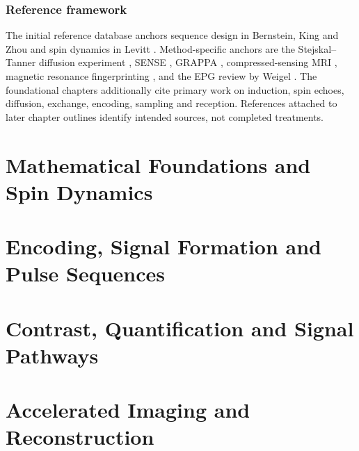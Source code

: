\documentclass[a4paper,10pt,twoside,openany]{book}
\begin{document}
\section*{Reference framework}
The initial reference database anchors sequence design in
Bernstein, King and Zhou \cite{bernstein2004} and spin dynamics in
Levitt \cite{levitt2008}. Method-specific anchors are the
Stejskal--Tanner diffusion experiment \cite{stejskal1965},
SENSE \cite{pruessmann1999}, GRAPPA \cite{griswold2002},
compressed-sensing MRI \cite{lustig2007}, magnetic resonance
fingerprinting \cite{ma2013}, and the EPG review by
Weigel \cite{weigel2015}. The foundational chapters additionally cite primary work on induction,
spin echoes, diffusion, exchange, encoding, sampling and reception.
References attached to later chapter outlines identify intended sources,
not completed treatments.

\tableofcontents

\mainmatter

\part{Mathematical Foundations and Spin Dynamics}





\part{Encoding, Signal Formation and Pulse Sequences}





\part{Contrast, Quantification and Signal Pathways}






\part{Accelerated Imaging and Reconstruction}



\end{document}
